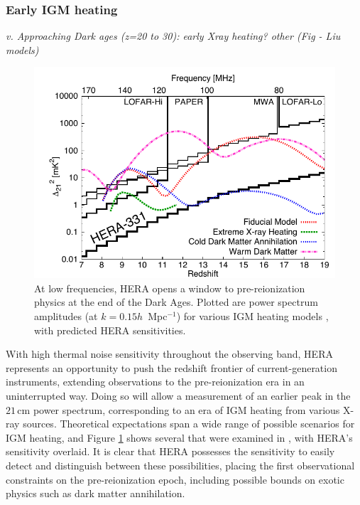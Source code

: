 \documentclass[preprint]{aastex}
\begin{document}
\subsubsection{Early IGM heating}
\emph{v. Approaching Dark ages (z=20 to 30): early Xray heating? other (Fig - Liu models)}
\begin{figure}[t]\centering
\includegraphics{plots/Xray/HERA_II_compare_kp1_whoriz_20pt.pdf} 
\caption{\small 
At low frequencies, HERA opens a window to
pre-reionization physics at the end of the Dark Ages. Plotted are power spectrum amplitudes (at $k =
0.15h$~Mpc$^{-1}$) for various IGM heating models \citep{mesinger_et_al2013},
with predicted HERA sensitivities.
}\label{fig:Xray} \end{figure}

With high thermal noise sensitivity throughout the observing band, HERA represents an opportunity to push the redshift frontier of current-generation instruments, extending observations to the pre-reionization era in an uninterrupted way.  Doing so will allow a measurement of an earlier peak in the $21\,\textrm{cm}$ power spectrum, corresponding to an era of IGM heating from various X-ray sources.  Theoretical expectations span a wide range of possible scenarios for IGM heating, and Figure \ref{fig:Xray} shows several that were examined in \cite{mesinger_et_al2013}, with HERA's sensitivity overlaid.  It is clear that HERA possesses the sensitivity to easily detect and distinguish between these possibilities, placing the first observational constraints on the pre-reionization epoch, including possible bounds on exotic physics such as dark matter annihilation.
\end{document}
